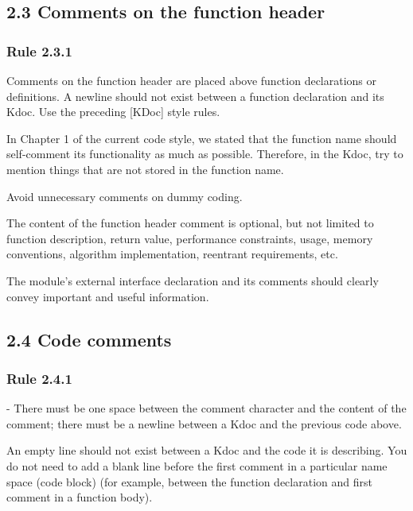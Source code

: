 \subsection*{\textbf{2.3 Comments on the function header}}

\subsubsection*{\textbf{Rule 2.3.1}}
\leavevmode\newline

Comments on the function header are placed above function declarations or definitions. A newline should not exist between a function declaration and its Kdoc. Use the preceding [KDoc] style rules.



In Chapter 1 of the current code style, we stated that the function name should self-comment its functionality as much as possible. Therefore, in the Kdoc, try to mention things that are not stored in the function name.

Avoid unnecessary comments on dummy coding.



The content of the function header comment is optional, but not limited to function description, return value, performance constraints, usage, memory conventions, algorithm implementation, reentrant requirements, etc.

The module's external interface declaration and its comments should clearly convey important and useful information.



\subsection*{\textbf{2.4 Code comments}}

\subsubsection*{\textbf{Rule 2.4.1}}
\leavevmode\newline



- There must be one space between the comment character and the content of the comment; there must be a newline between a Kdoc and the previous code above.

An empty line should not exist between a Kdoc and the code it is describing. You do not need to add a blank line before the first comment in a particular name space (code block) (for example, between the function declaration and first comment in a function body).



